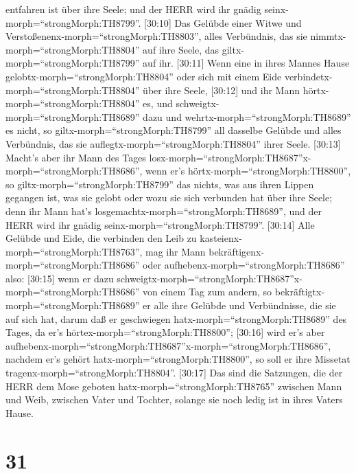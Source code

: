 entfahren ist über ihre Seele; und der HERR wird ihr gnädig
seinx-morph=``strongMorph:TH8799''.  {[}30:10{]} Das Gelübde
einer Witwe und Verstoßenenx-morph=``strongMorph:TH8803'', alles
Verbündnis, das sie nimmtx-morph=``strongMorph:TH8804'' auf ihre Seele,
das giltx-morph=``strongMorph:TH8799'' auf ihr. 
{[}30:11{]} Wenn eine in ihres Mannes Hause
gelobtx-morph=``strongMorph:TH8804'' oder sich mit einem Eide
verbindetx-morph=``strongMorph:TH8804'' über ihre Seele, 
{[}30:12{]} und ihr Mann hörtx-morph=``strongMorph:TH8804'' es, und
schweigtx-morph=``strongMorph:TH8689'' dazu und
wehrtx-morph=``strongMorph:TH8689'' es nicht, so
giltx-morph=``strongMorph:TH8799'' all dasselbe Gelübde und alles
Verbündnis, das sie auflegtx-morph=``strongMorph:TH8804'' ihrer Seele.
 {[}30:13{]} Macht's aber ihr Mann des Tages
losx-morph=``strongMorph:TH8687''x-morph=``strongMorph:TH8686'', wenn
er's hörtx-morph=``strongMorph:TH8800'', so
giltx-morph=``strongMorph:TH8799'' das nichts, was aus ihren Lippen
gegangen ist, was sie gelobt oder wozu sie sich verbunden hat über ihre
Seele; denn ihr Mann hat's losgemachtx-morph=``strongMorph:TH8689'', und
der HERR wird ihr gnädig seinx-morph=``strongMorph:TH8799''.
 {[}30:14{]} Alle Gelübde und Eide, die verbinden den Leib
zu kasteienx-morph=``strongMorph:TH8763'', mag ihr Mann
bekräftigenx-morph=``strongMorph:TH8686'' oder
aufhebenx-morph=``strongMorph:TH8686'' also:  {[}30:15{]}
wenn er dazu
schweigtx-morph=``strongMorph:TH8687''x-morph=``strongMorph:TH8686'' von
einem Tag zum andern, so bekräftigtx-morph=``strongMorph:TH8689'' er
alle ihre Gelübde und Verbündnisse, die sie auf sich hat, darum daß er
geschwiegen hatx-morph=``strongMorph:TH8689'' des Tages, da er's
hörtex-morph=``strongMorph:TH8800'';  {[}30:16{]} wird er's
aber
aufhebenx-morph=``strongMorph:TH8687''x-morph=``strongMorph:TH8686'',
nachdem er's gehört hatx-morph=``strongMorph:TH8800'', so soll er ihre
Missetat tragenx-morph=``strongMorph:TH8804''.  {[}30:17{]}
Das sind die Satzungen, die der HERR dem Mose geboten
hatx-morph=``strongMorph:TH8765'' zwischen Mann und Weib, zwischen Vater
und Tochter, solange sie noch ledig ist in ihres Vaters Hause.

\hypertarget{section-30}{%
\section{31}\label{section-30}}

